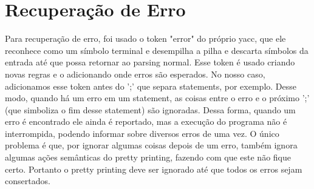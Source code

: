 \section{Recuperação de Erro}
Para recuperação de erro, foi usado o token "error" do próprio yacc, que ele reconhece como um símbolo terminal e desempilha a pilha e descarta símbolos da entrada até que possa retornar ao parsing normal. Esse token é usado criando novas regras e o adicionando onde erros são esperados. No nosso caso, adicionamos esse token antes do ';' que separa statements, por exemplo. Desse modo, quando há um erro em um statement, as coisas entre o erro e o próximo ';' (que simboliza o fim desse statement) são ignoradas. Dessa forma, quando um erro é encontrado ele ainda é reportado, mas a execução do programa não é interrompida, podendo informar sobre diversos erros de uma vez. O único problema é que, por ignorar algumas coisas depois de um erro, também ignora algumas ações semânticas do pretty printing, fazendo com que este não fique certo. Portanto o pretty printing deve ser ignorado até que todos os erros sejam consertados.